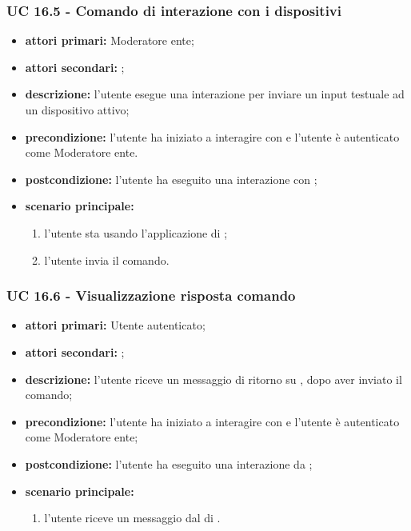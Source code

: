 	\subsubsection{UC 16.5 - Comando di interazione con i dispositivi}

	\begin{itemize}
		\item \textbf{attori primari:} Moderatore ente;
		\item \textbf{attori secondari:} ;
		\item \textbf{descrizione:} l'utente esegue una interazione per inviare un input testuale ad un dispositivo attivo; 
		\item \textbf{precondizione:} l'utente ha iniziato a interagire con  e l'utente è autenticato come Moderatore ente.
		\item \textbf{postcondizione:} l'utente ha eseguito una interazione con ;
		\item \textbf{scenario principale:}
		\begin{enumerate}
			\item l'utente sta usando l'applicazione di ;
			\item l'utente invia il comando.
		\end{enumerate}
	\end{itemize}


	\subsubsection{UC 16.6 - Visualizzazione risposta comando }

	\begin{itemize}
		\item \textbf{attori primari:} Utente autenticato;
		\item \textbf{attori secondari:} ;
		\item \textbf{descrizione:} l'utente riceve un messaggio di ritorno su , dopo aver inviato il comando;
		\item \textbf{precondizione:} l'utente ha iniziato a interagire con  e l'utente è autenticato come Moderatore ente;
		\item \textbf{postcondizione:} l'utente ha eseguito una interazione da ;
		\item \textbf{scenario principale:}
		\begin{enumerate}
			\item l'utente riceve un messaggio dal  di .
		\end{enumerate}
	\end{itemize}

